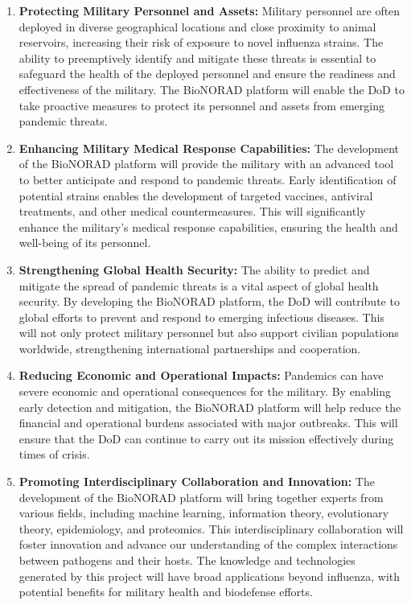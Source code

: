 \documentclass[onecolumn, compsoc,12pt]{IEEEtran}
\begin{document}
\begin{enumerate}
    \item \textbf{Protecting Military Personnel and Assets:} Military personnel are often deployed in diverse geographical locations and close proximity to animal reservoirs, increasing their risk of exposure to novel influenza strains. The ability to preemptively identify and mitigate these threats is essential to safeguard the health of the deployed personnel and ensure the readiness and effectiveness of the military. The BioNORAD platform will enable the DoD to take proactive measures to protect its personnel and assets from emerging pandemic threats.

    \item \textbf{Enhancing Military Medical Response Capabilities:} The development of the BioNORAD platform will provide the military with an advanced tool to better anticipate and respond to pandemic threats. Early identification of potential strains enables the development of targeted vaccines, antiviral treatments, and other medical countermeasures. This will significantly enhance the military's medical response capabilities, ensuring the health and well-being of its personnel.

    \item \textbf{Strengthening Global Health Security:} The ability to predict and mitigate the spread of pandemic threats is a vital aspect of global health security. By developing the BioNORAD platform, the DoD will contribute to global efforts to prevent and respond to emerging infectious diseases. This will not only protect military personnel but also support civilian populations worldwide, strengthening international partnerships and cooperation.

    \item \textbf{Reducing Economic and Operational Impacts:} Pandemics can have severe economic and operational consequences for the military. By enabling early detection and mitigation, the BioNORAD platform will help reduce the financial and operational burdens associated with major outbreaks. This will ensure that the DoD can continue to carry out its mission effectively during times of crisis.

    \item \textbf{Promoting Interdisciplinary Collaboration and Innovation:} The development of the BioNORAD platform will bring together experts from various fields, including machine learning, information theory, evolutionary theory, epidemiology, and proteomics. This interdisciplinary collaboration will foster innovation and advance our understanding of the complex interactions between pathogens and their hosts. The knowledge and technologies generated by this project will have broad applications beyond influenza, with potential benefits for military health and biodefense efforts.
\end{enumerate}
\end{document}

